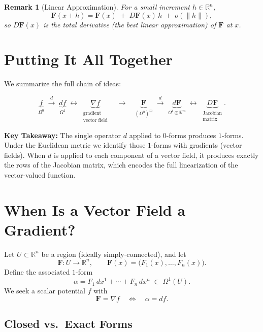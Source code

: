 \documentclass[12pt]{article}
\theoremstyle{definitionstyle}
\newtheorem{remark}{Remark} %
\newcommand{\R}{\mathbb{R}}
\begin{document}
	\begin{remark}[Linear Approximation]
		For a small increment \(h\in\R^n\),
		\[
		\mathbf F(x+h)
		= \mathbf F(x) \;+\;D\mathbf F(x)\,h \;+\; o(\|h\|),
		\]
		so \(D\mathbf F(x)\) is the total derivative (the best linear approximation) of \(\mathbf F\) at \(x\).
	\end{remark}
	
	\bigskip
	
	\section*{Putting It All Together}
	
	We summarize the full chain of ideas:
	
	\[
	\underbrace{f}_{\Omega^0}
	\;\xrightarrow{d}\;
	\underbrace{df}_{\Omega^1}
	\;\longleftrightarrow\;
	\underbrace{\nabla f}_{\substack{\text{gradient}\\\text{vector field}}}
	\quad
	\longrightarrow
	\quad
	\underbrace{\mathbf F}_{(\Omega^0)^m}
	\;\xrightarrow{d}\;
	\underbrace{d\mathbf F}_{\Omega^1\otimes\R^m}
	\;\longleftrightarrow\;
	\underbrace{D\mathbf F}_{\substack{\text{Jacobian}\\\text{matrix}}}.
	\]
	
	\medskip
	
	\noindent\textbf{Key Takeaway:} The single operator \(d\) applied to \(0\)-forms produces \(1\)-forms.  Under the Euclidean metric we identify those \(1\)-forms with gradients (vector fields).  When \(d\) is applied to each component of a vector field, it produces exactly the rows of the Jacobian matrix, which encodes the full linearization of the vector‐valued function.
	
	\newpage
	\section*{When Is a Vector Field a Gradient?}
	
	Let \(U\subset\R^n\) be a region (ideally simply‐connected), and let
	\[
	\mathbf F:U\longrightarrow\R^n,
	\qquad
	\mathbf F(x)
	=\bigl(F_1(x),\dots,F_n(x)\bigr).
	\]
	Define the associated \(1\)\nobreakdash-form
	\[
	\alpha
	=F_1\,dx^1+\cdots+F_n\,dx^n
	\;\in\;\Omega^1(U).
	\]
	We seek a scalar potential \(f\) with
	\[
	\mathbf F = \nabla f
	\quad\Longleftrightarrow\quad
	\alpha = df.
	\]
	
	\subsection*{Closed vs.\ Exact Forms}
	
\end{document}
